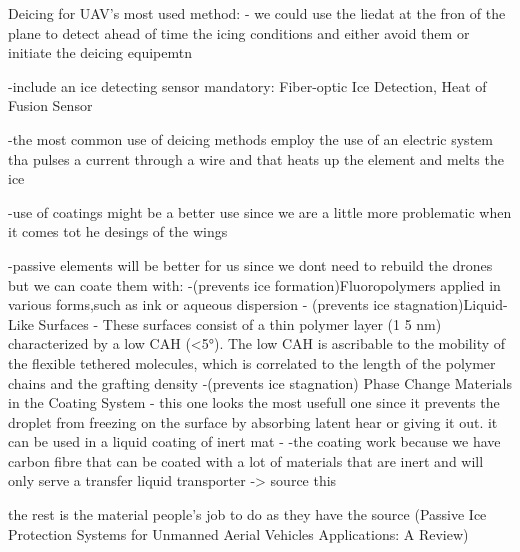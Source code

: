 Deicing for UAV's most used method:
- we could use the liedat at the fron of the plane to detect ahead of time the icing conditions and either avoid them or initiate the deicing equipemtn

-include an ice detecting sensor mandatory: Fiber-optic Ice Detection,  Heat of Fusion Sensor

-the most common use of deicing methods employ the use of an electric system tha pulses a current through a wire and that heats up the element and melts the ice

-use of coatings might be a better use since we are a little more problematic when it comes tot he desings of the wings

-passive elements will be better for us since we dont need to rebuild the drones but we can coate them with: 
                    -(prevents ice formation)Fluoropolymers applied in various forms,such as ink or aqueous dispersion
                    - (prevents ice stagnation)Liquid-Like Surfaces - These surfaces consist of a thin polymer layer (1 5 nm) characterized by a low CAH (<5°). The low CAH is ascribable to the mobility of the flexible tethered molecules, which is correlated to the length of the polymer chains and the grafting density
                    -(prevents ice stagnation) Phase Change Materials in the Coating System - this one looks the most usefull one since it prevents the droplet from freezing on the surface by absorbing latent hear or giving it out. it can be used in a liquid coating of inert mat
                    - 
-the coating work because we have carbon fibre that can be coated with a lot of materials that are inert and will only serve a transfer liquid transporter -> source this

the rest is the material people's job to do as they have the source (Passive Ice Protection Systems for Unmanned Aerial
Vehicles Applications: A Review)